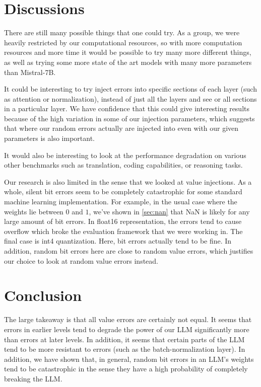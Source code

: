 \section{Discussions}
There are still many possible things that one could try. As a group, we were heavily restricted by our computational resources, so with more computation resources
and more time it would be possible to try many more different things, as well as trying some more state of the art models with many more parameters than
Mistral-7B.

It could be interesting to try inject errors into specific sections of each layer (such as attention or normalization), instead of just all the layers and see
or all sections in a particular layer. We have confidence that this could give interesting results because of the high variation in some of our injection parameters,
which suggests that where our random errors actually are injected into even with our given parameters is also important.

It would also be interesting to look at the performance degradation on various other benchmarks such as translation, coding capabilities, or reasoning tasks.

Our research is also limited in the sense that we looked at value injections. As a whole, silent bit errors seem to be completely catastrophic for
some standard machine learning implementation. For example, in the usual case where the weights lie between $0$ and $1$, we've shown in \ref{sec:nan} that NaN
is likely for any large amount of bit errors. In float16 representation, the errors tend to cause overflow which broke the evaluation framework that we were working in.
The final case is int4 quantization. Here, bit errors actually tend to be fine. In addition, random bit errors here are close to random value errors, which justifies our choice to look at
random value errors instead.

\section{Conclusion}
\label{sec:conclusion}
The large takeaway is that all value errors are certainly not equal. It seems that errors in earlier levels tend to degrade the power of our LLM significantly more than errors at later levels.
In addition, it seems that certain parts of the LLM tend to be more resistant to errors (such as the batch-normalization layer). In addition, we have shown that, in general,
random bit errors in an LLM's weights tend to be catastrophic in the sense they have a high probability of completely breaking the LLM.

